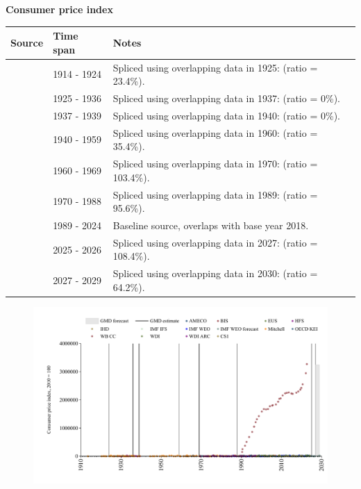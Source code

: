 \documentclass[12pt,a4paper,landscape]{article}
\begin{document}
\begin{adjustbox}{max totalsize={\paperwidth}{\paperheight},center}
\begin{minipage}[t][\textheight][t]{\textwidth}
\vspace*{0.5cm}
{}
\begin{center}
{\Large\bfseries Consumer price index}
\end{center}
\vspace{0.5cm}
\begin{table}[H]
\centering
\small
\begin{tabular}{|l|l|l|}
\hline
\textbf{Source} & \textbf{Time span} & \textbf{Notes} \\
\hline
\rowcolor{white}\cite{Mitchell}& 1914 - 1924 &Spliced using overlapping data in 1925: (ratio = 23.4\%). \\
\rowcolor{lightgray}\cite{IHD}& 1925 - 1936 &Spliced using overlapping data in 1937: (ratio = 0\%). \\
\rowcolor{white}\cite{HFS}& 1937 - 1939 &Spliced using overlapping data in 1940: (ratio = 0\%). \\
\rowcolor{lightgray}\cite{Mitchell}& 1940 - 1959 &Spliced using overlapping data in 1960: (ratio = 35.4\%). \\
\rowcolor{white}\cite{AMECO}& 1960 - 1969 &Spliced using overlapping data in 1970: (ratio = 103.4\%). \\
\rowcolor{lightgray}\cite{WDI}& 1970 - 1988 &Spliced using overlapping data in 1989: (ratio = 95.6\%). \\
\rowcolor{white}\cite{BIS}& 1989 - 2024 &Baseline source, overlaps with base year 2018. \\
\rowcolor{lightgray}\cite{AMECO}& 2025 - 2026 &Spliced using overlapping data in 2027: (ratio = 108.4\%). \\
\rowcolor{white}\cite{IMF_WEO_forecast}& 2027 - 2029 &Spliced using overlapping data in 2030: (ratio = 64.2\%). \\
\hline
\end{tabular}
\end{table}
\begin{figure}[H]
\centering
\includegraphics[width=\textwidth,height=0.6\textheight,keepaspectratio]{graphs/POL_CPI.pdf}
\end{figure}
\end{minipage}
\end{adjustbox}
\end{document}
